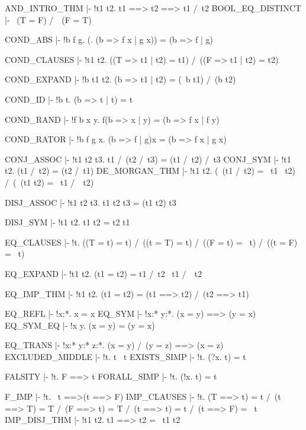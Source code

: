 \THEOREM AND\_INTRO\_THM {\none}
|- !t1 t2. t1 ==> t2 ==> t1 /\ t2
\ENDTHEOREM
\THEOREM BOOL\_EQ\_DISTINCT {\none}
|- ~(T = F) /\ ~(F = T)
\ENDTHEOREM

\THEOREM COND\_ABS {\none}
|- !b f g. (\x. (b => f x | g x)) = (b => f | g)
\ENDTHEOREM

\THEOREM COND\_CLAUSES {\none}
|- !t1 t2. ((T => t1 | t2) = t1) /\ ((F => t1 | t2) = t2)
\ENDTHEOREM

\THEOREM COND\_EXPAND {\none}
|- !b t1 t2. (b => t1 | t2) = (~b \/ t1) /\ (b \/ t2)
\ENDTHEOREM

\THEOREM COND\_ID {\none}
|- !b t. (b => t | t) = t
\ENDTHEOREM

\THEOREM COND\_RAND {\none}
|- !f b x y. f(b => x | y) = (b => f x | f y)
\ENDTHEOREM

\THEOREM COND\_RATOR {\none}
|- !b f g x. (b => f | g)x = (b => f x | g x)
\ENDTHEOREM

\THEOREM CONJ\_ASSOC {\none}
|- !t1 t2 t3. t1 /\ (t2 /\ t3) = (t1 /\ t2) /\ t3
\ENDTHEOREM
\THEOREM CONJ\_SYM {\none}
|- !t1 t2. (t1 /\ t2) = (t2 /\ t1)
\ENDTHEOREM
\THEOREM DE\_MORGAN\_THM {\none}
|- !t1 t2. (~(t1 /\ t2) = ~t1 \/ ~t2) /\ (~(t1 \/ t2) = ~t1 /\ ~t2)
\ENDTHEOREM

\THEOREM DISJ\_ASSOC {\none}
|- !t1 t2 t3. t1 \/ t2 \/ t3 = (t1 \/ t2) \/ t3
\ENDTHEOREM

\THEOREM DISJ\_SYM {\none}
|- !t1 t2. t1 \/ t2 = t2 \/ t1
\ENDTHEOREM

\THEOREM EQ\_CLAUSES {\none}
|- !t.
    ((T = t) = t) /\ ((t = T) = t) /\ ((F = t) = ~t) /\ ((t = F) = ~t)
\ENDTHEOREM

\THEOREM EQ\_EXPAND {\none}
|- !t1 t2. (t1 = t2) = t1 /\ t2 \/ ~t1 /\ ~t2
\ENDTHEOREM

\THEOREM EQ\_IMP\_THM {\none}
|- !t1 t2. (t1 = t2) = (t1 ==> t2) /\ (t2 ==> t1)
\ENDTHEOREM

\THEOREM EQ\_REFL {\none}
|- !x:*. x = x
\ENDTHEOREM
\THEOREM EQ\_SYM {\none}
|- !x:* y:*. (x = y) ==> (y = x)
\ENDTHEOREM
\THEOREM EQ\_SYM\_EQ {\none}
|- !x y. (x = y) = (y = x)
\ENDTHEOREM

\THEOREM EQ\_TRANS {\none}
|- !x:* y:* z:*. (x = y) /\ (y = z) ==> (x = z)
\ENDTHEOREM
\THEOREM EXCLUDED\_MIDDLE {\none}
|- !t. t \/ ~t
\ENDTHEOREM
\THEOREM EXISTS\_SIMP {\none}
|- !t. (?x. t) = t
\ENDTHEOREM

\THEOREM FALSITY {\none}
|- !t. F ==> t
\ENDTHEOREM
\THEOREM FORALL\_SIMP {\none}
|- !t. (!x. t) = t
\ENDTHEOREM

\THEOREM F\_IMP {\none}
|- !t. ~t ==>(t ==> F)
\ENDTHEOREM
\THEOREM IMP\_CLAUSES {\none}
|- !t. (T ==> t) = t /\
       (t ==> T) = T /\
       (F ==> t) = T /\
       (t ==> t) = t /\
       (t ==> F) = ~t
\ENDTHEOREM
\THEOREM IMP\_DISJ\_THM {\none}
|- !t1 t2. t1 ==> t2 = ~t1 \/ t2
\ENDTHEOREM

